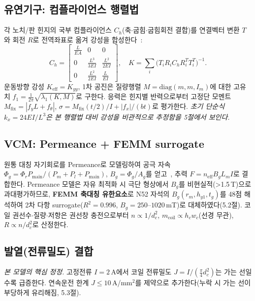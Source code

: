 \documentclass[10pt,twocolumn,letterpaper]{article}
\begin{document}
\subsection{유연기구: 컴플라이언스 행렬법}
각 노치/판 힌지의 국부 컴플라이언스 $C_h$(축$\cdot$굽힘$\cdot$굽힘회전 결합)를 연결벡터 변환 $T$와 회전 $R$로 전역좌표로 옮겨 강성을 합성한다~\cite{lec08}:
\begin{equation}
C_h=\begin{bmatrix}\tfrac{L}{EA}&0&0\\[2pt]0&\tfrac{L^3}{3EI}&\tfrac{L^2}{2EI}\\[2pt]0&\tfrac{L^2}{2EI}&\tfrac{L}{EI}\end{bmatrix},\quad
K=\sum_i \big(T_iR_iC_{h}R_i^TT_i^T\big)^{-1}.
\end{equation}
운동방향 강성 $K_{\text{eff}}=K_{yy}$, 1차 공진은 질량행렬 $M=\mathrm{diag}(m,m,I_m)$에 대한 고유치 $f_1=\tfrac1{2\pi}\sqrt{\lambda_1(K,M)}$로 구한다. 응력은 힌지별 반력으로부터 고정단 모멘트 $M_{\text{fix}}=|f_y L+f_\theta|$, $\sigma=M_{\text{fix}}(t/2)/I+|f_x|/(bt)$로 평가한다. \emph{초기 단순식 $k_x=24EI/L^3$은 본 행렬법 대비 강성을 비관적으로 추정함을 5절에서 보인다.}

\subsection{VCM: Permeance + FEMM surrogate}
원통 대칭 자기회로를 Permeance로 모델링하여 공극 자속 $\Phi_g=\Phi_r P_{\text{main}}/(P_m+P_l+P_{\text{main}})$, $B_g=\Phi_g/A_g$를 얻고~\cite{kang2023}, 추력 $F=n_{\text{eff}}B_g L_m I$로 결합한다. Permeance 모델은 자유 최적화 시 극단 형상에서 $B_g$를 비현실적(>1.5\,T)으로 과대평가하므로, \textbf{FEMM 축대칭 유한요소}로 N52 자석의 $B_g(r_m,h_{y1},t_g)$를 48점 해석하여 2차 다항 surrogate($R^2=0.996$, $B_g\!=\!250$--$1020$\,mT)로 대체하였다(5.2절). 코일 권선수$\cdot$질량$\cdot$저항은 권선창 충전으로부터 $n\!\propto\!1/d_c^2$, $m_{\text{coil}}\!\propto\!h_c w_c$(선경 무관), $R\!\propto\!n/d_c^2$로 산정한다.

\subsection{발열(전류밀도) 결합}
\emph{본 모델의 핵심 정정.} 고정전류 $I=2$\,A에서 코일 전류밀도 $J=I/(\tfrac\pi4 d_c^2)$는 가는 선일수록 급증한다. 연속운전 한계 $J\le10$\,A/mm$^2$를 제약으로 추가한다(누락 시 가는 선이 부당하게 유리해짐, 5.3절).
\end{document}
